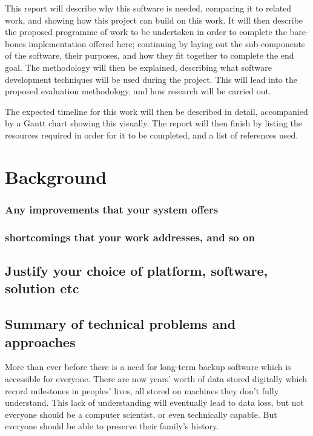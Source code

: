 \documentclass[12pt,a4paper,]{adreport}
\begin{document}
This report will describe why this software is needed, comparing it to
related work, and showing how this project can build on this work. It
will then describe the proposed programme of work to be undertaken in
order to complete the bare-bones implementation offered here; continuing
by laying out the sub-components of the software, their purposes, and
how they fit together to complete the end goal. The methodology will
then be explained, describing what software development techniques will
be used during the project. This will lead into the proposed evaluation
methodology, and how research will be carried out.

The expected timeline for this work will then be described in detail,
accompanied by a Gantt chart showing this visually. The report will then
finish by listing the resources required in order for it to be
completed, and a list of references used.

\chapter{Background}\label{background}

\subsection{Any improvements that your system
offers}\label{any-improvements-that-your-system-offers}

\subsection{shortcomings that your work addresses, and so
on}\label{shortcomings-that-your-work-addresses-and-so-on}

\section{Justify your choice of platform, software, solution
etc}\label{justify-your-choice-of-platform-software-solution-etc}

\section{Summary of technical problems and
approaches}\label{summary-of-technical-problems-and-approaches}

More than ever before there is a need for long-term backup software
which is accessible for everyone. There are now years' worth of data
stored digitally which record milestones in peoples' lives, all stored
on machines they don't fully understand. This lack of understanding will
eventually lead to data loss, but not everyone should be a computer
scientist, or even technically capable. But everyone should be able to
preserve their family's history.
\end{document}
